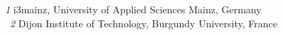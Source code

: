 \textit{1}  i3mainz, University of Applied Sciences Mainz, Germany    \\                                                                    
\ \textit{2}  Dijon Institute of Technology, Burgundy University, France \\